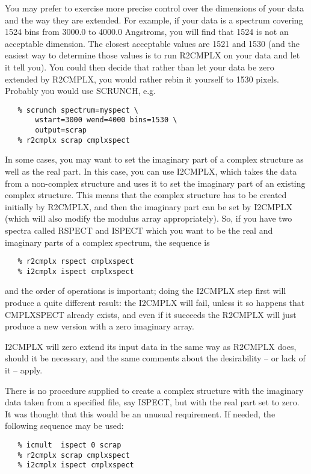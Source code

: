 You may prefer to exercise more precise control over the dimensions
of your data and the way they are extended.  For example, if your data
is a spectrum covering 1524 bins from 3000.0 to 4000.0 Angstroms, you
will find that 1524 is not an acceptable dimension.  The closest acceptable
values are 1521 and 1530 (and the easiest way to determine those values is
to run R2CMPLX on your data and let it tell you).  You could then decide
that rather than let your data be zero extended by R2CMPLX, you would
rather rebin it yourself to 1530 pixels.  Probably you would use SCRUNCH, e.g.

\begin{verbatim}
   % scrunch spectrum=myspect \
       wstart=3000 wend=4000 bins=1530 \
       output=scrap
   % r2cmplx scrap cmplxspect
\end{verbatim}

In some cases, you may want to set the imaginary part of a complex
structure as well as the real part.  In this case, you can use I2CMPLX,
which takes the data from a non-complex structure and uses it to set the
imaginary part of an existing complex structure.  This means that the
complex structure has to be created initially by R2CMPLX, and then the
imaginary part can be set by I2CMPLX (which will also modify the modulus
array appropriately).  So, if you have two spectra called RSPECT and
ISPECT which you want to be the real and imaginary parts of a complex
spectrum, the sequence is

\begin{verbatim}
   % r2cmplx rspect cmplxspect
   % i2cmplx ispect cmplxspect
\end{verbatim}

and the order of operations is important; doing the I2CMPLX step first
will produce a quite different result: the I2CMPLX will fail, unless
it so happens that CMPLXSPECT already exists, and even if it succeeds the
R2CMPLX will just produce a new version with a zero imaginary array.

I2CMPLX will zero extend its input data in the same way as R2CMPLX
does, should it be necessary, and the same comments about the desirability
-- or lack of it -- apply.

There is no procedure supplied to create a complex structure with
the imaginary data taken from a specified file, say ISPECT, but with the
real part set to zero.  It was thought that this would be an unusual
requirement.  If needed, the following sequence may be used:

\begin{verbatim}
   % icmult  ispect 0 scrap
   % r2cmplx scrap cmplxspect
   % i2cmplx ispect cmplxspect
\end{verbatim}


